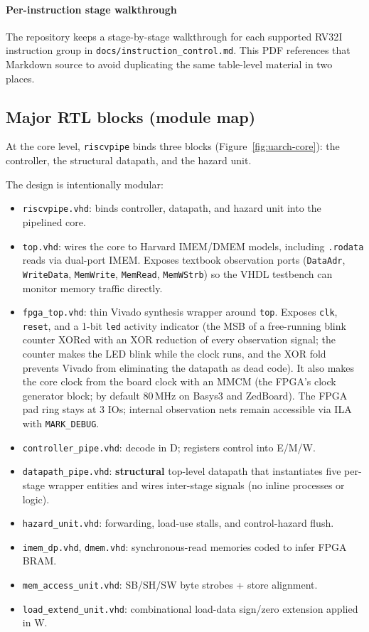 \paragraph{Per-instruction stage walkthrough}
The repository keeps a stage-by-stage walkthrough for each supported RV32I
instruction group in \texttt{docs/instruction\_control.md}. This PDF references
that Markdown source to avoid duplicating the same table-level material in two
places.

\subsection{Major RTL blocks (module map)}
At the core level, \texttt{riscvpipe} binds three blocks
(Figure~\ref{fig:uarch-core}): the controller, the structural datapath, and the
hazard unit.

The design is intentionally modular:
\begin{itemize}[leftmargin=*]
  \item \texttt{riscvpipe.vhd}: binds controller, datapath, and hazard unit into the pipelined core.
  \item \texttt{top.vhd}: wires the core to Harvard IMEM/DMEM models, including \texttt{.rodata} reads via dual-port IMEM. Exposes textbook observation ports (\texttt{DataAdr}, \texttt{WriteData}, \texttt{MemWrite}, \texttt{MemRead}, \texttt{MemWStrb}) so the VHDL testbench can monitor memory traffic directly.
  \item \texttt{fpga\_top.vhd}: thin Vivado synthesis wrapper around \texttt{top}. Exposes \texttt{clk}, \texttt{reset}, and a 1-bit \texttt{led} activity indicator (the MSB of a free-running blink counter XORed with an XOR reduction of every observation signal; the counter makes the LED blink while the clock runs, and the XOR fold prevents Vivado from eliminating the datapath as dead code). It also makes the core clock from the board clock with an MMCM (the FPGA's clock generator block; by default 80\,MHz on Basys3 and ZedBoard). The FPGA pad ring stays at 3 IOs; internal observation nets remain accessible via ILA with \texttt{MARK\_DEBUG}.
  \item \texttt{controller\_pipe.vhd}: decode in D; registers control into E/M/W.
  \item \texttt{datapath\_pipe.vhd}: \textbf{structural} top-level datapath that instantiates five per-stage wrapper entities and wires inter-stage signals (no inline processes or logic).
  \item \texttt{hazard\_unit.vhd}: forwarding, load-use stalls, and control-hazard flush.
  \item \texttt{imem\_dp.vhd}, \texttt{dmem.vhd}: synchronous-read memories coded to infer FPGA BRAM.
  \item \texttt{mem\_access\_unit.vhd}: SB/SH/SW byte strobes + store alignment.
  \item \texttt{load\_extend\_unit.vhd}: combinational load-data sign/zero extension applied in W.
\end{itemize}

